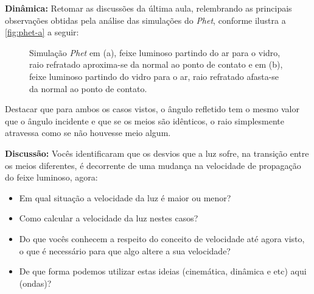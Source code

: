     \noindent \textbf{Dinâmica:} Retomar as discussões da última aula, relembrando as principais observações obtidas pela análise das simulações do \emph{Phet}, conforme ilustra a \autoref{fig:phet-a} a seguir:
    \vspace*{10pt}
    \begin{figure}[!ht]        
        \centering              
        \hfill
        \caption{Simulação \emph{Phet} em (a), feixe luminoso partindo do ar para o vidro, raio refratado aproxima-se da normal ao ponto de contato e em (b), feixe luminoso partindo do vidro para o ar, raio refratado afasta-se da normal ao ponto de contato.}
        \label{fig:phet-a}
    \end{figure}
    \vspace*{10pt}
    \par \noindent Destacar que para ambos os casos vistos, o ângulo refletido tem o mesmo valor que o ângulo incidente e que se os meios são idênticos, o raio simplesmente atravessa como se não houvesse meio algum.
    
    \par\noindent\textbf{Discussão:} Vocês identificaram que os desvios que a luz sofre, na transição entre os meios diferentes, é decorrente de uma mudança na velocidade de propagação do feixe luminoso, agora:
    \begin{itemize}
        \item Em qual situação a velocidade da luz é maior ou menor?
        \item Como calcular a velocidade da luz nestes casos?
        \item Do que vocês conhecem a respeito do conceito de velocidade até agora visto, o que é necessário para que algo altere a sua velocidade?
        \item De que forma podemos utilizar estas ideias (cinemática, dinâmica e etc) aqui (ondas)?
    \end{itemize}

